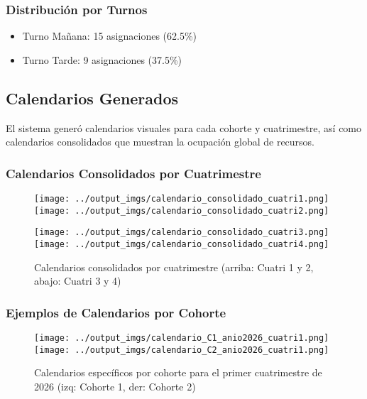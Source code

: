 \subsubsection{Distribución por Turnos}
\begin{itemize}
    \item Turno Mañana: 15 asignaciones (62.5\%)
    \item Turno Tarde: 9 asignaciones (37.5\%)
\end{itemize}

\subsection{Calendarios Generados}

El sistema generó calendarios visuales para cada cohorte y cuatrimestre, así como calendarios consolidados que muestran la ocupación global de recursos.

\subsubsection{Calendarios Consolidados por Cuatrimestre}

\begin{figure}[htbp]
    \centering
    \texttt{[image: ../output\_imgs/calendario\_consolidado\_cuatri1.png]}
    \hfill
    \texttt{[image: ../output\_imgs/calendario\_consolidado\_cuatri2.png]}
    
    \vspace{0.5cm}
    
    \texttt{[image: ../output\_imgs/calendario\_consolidado\_cuatri3.png]}
    \hfill
    \texttt{[image: ../output\_imgs/calendario\_consolidado\_cuatri4.png]}
    
    \caption{Calendarios consolidados por cuatrimestre (arriba: Cuatri 1 y 2, abajo: Cuatri 3 y 4)}
    \label{fig:calendarios_consolidados}
\end{figure}

\subsubsection{Ejemplos de Calendarios por Cohorte}

\begin{figure}[htbp]
    \centering
    \texttt{[image: ../output\_imgs/calendario\_C1\_anio2026\_cuatri1.png]}
    \hfill
    \texttt{[image: ../output\_imgs/calendario\_C2\_anio2026\_cuatri1.png]}
    
    \caption{Calendarios específicos por cohorte para el primer cuatrimestre de 2026 (izq: Cohorte 1, der: Cohorte 2)}
    \label{fig:calendarios_cohortes}
\end{figure}

